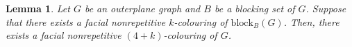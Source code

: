 \documentclass{patmorin}
\let\emptyset\varnothing
\newcommand{\block}{\mathrm{block}}
\newtheorem{lemma}[theorem]{Lemma}
\newtheorem{claim}{Claim}[theorem]
\begin{document}
\begin{lemma}
 Let $G$ be an outerplane graph and $B$ be a blocking set of $G$. Suppose that there exists a facial nonrepetitive $k$-colouring of $\block_{B}(G)$. Then, there exists a facial nonrepetitive $(4+k)$-colouring of $G$.
 \label{lem:hitting_plus_four}
\end{lemma}

 
% 
\end{document}
